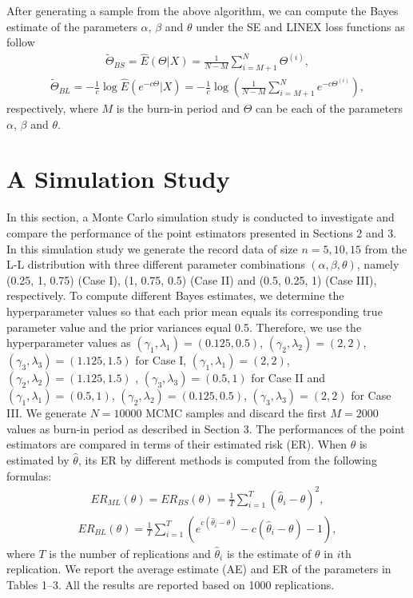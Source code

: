 \documentclass[twoside]{article}
\begin{document}
After generating a sample from the above algorithm, we can compute the Bayes estimate of the parameters $\alpha$, $\beta$ and $\theta$ under the SE and LINEX loss functions as follow
\begin{eqnarray} \label{16}
{{\tilde \Theta }_{BS}} = \hat E(\Theta |X) = \frac{1}{{N - M}}\sum\limits_{i = M + 1}^N {{\Theta ^{(i)}}},
\end{eqnarray}
\vskip -8mm
\begin{eqnarray} \label{17}
{{\tilde \Theta }_{BL}} =  - \frac{1}{c}\log \hat E({e^{ - c\Theta }}|X) =  - \frac{1}{c}\log \left( {\frac{1}{{N - M}}\sum\limits_{i = M + 1}^N {{e^{ - c{\Theta ^{(i)}}}}} } \right),
\end{eqnarray}
respectively, where $M$ is the burn-in period and $\Theta$ can be each of the parameters $\alpha$, $\beta$ and $\theta$. 

\section{A Simulation Study}
In this section, a Monte Carlo simulation study is conducted to investigate and compare the performance of the point estimators presented in Sections 2 and 3. In this simulation study we generate the record data of size $n=5, 10, 15$ from the L-L distribution with three different parameter combinations $(\alpha, \beta, \theta)$, namely (0.25, 1, 0.75) (Case I), (1, 0.75, 0.5) (Case II) and (0.5, 0.25, 1) (Case III), respectively. To compute different Bayes estimates, we determine the hyperparameter values so that each prior mean equals its corresponding true parameter value and the prior variances equal 0.5. Therefore, we use the hyperparameter values as $({\gamma _1},{\lambda _1}) = (0.125,0.5)$, $({\gamma _2},{\lambda _2}) = (2,2)$, $({\gamma _3},{\lambda _3}) = (1.125,1.5)$ for Case I, $({\gamma _1},{\lambda _1}) = (2,2)$, $({\gamma _2},{\lambda _2}) = (1.125,1.5)$ , $({\gamma _3},{\lambda _3}) = (0.5,1)$ for Case II and $({\gamma _1},{\lambda _1}) = (0.5,1)$, $({\gamma _2},{\lambda _2}) = (0.125,0.5)$, $({\gamma _3},{\lambda _3}) = (2,2)$ for Case III. We generate $N=10000$ MCMC samples and discard the first $M=2000$ values as burn-in period as described in Section 3. The performances of the point estimators are compared in terms of their estimated risk (ER). When $\theta$ is estimated by $\hat \theta$, its ER by different methods is computed from the following formulas:
\begin{eqnarray*}
E{R_{ML}}(\theta ) = E{R_{BS}}(\theta ) = \frac{1}{T}\sum\limits_{i = 1}^T {{{({{\hat \theta }_i} - \theta )}^2}},
\end{eqnarray*}
\vskip -8mm
\begin{eqnarray*}
E{R_{BL}}(\theta ) = \frac{1}{T}\sum\limits_{i = 1}^T {\left( {{e^{c({{\hat \theta }_i} - \theta )}} - c({{\hat \theta }_i} - \theta ) - 1} \right)},
\end{eqnarray*}
where $T$ is the number of replications and ${{\hat \theta }_i}$ is the estimate of $\theta$ in $i$th replication. We report the average estimate (AE) and ER of the parameters in Tables 1--3. All the results are reported based on 1000 replications.
\end{document}
